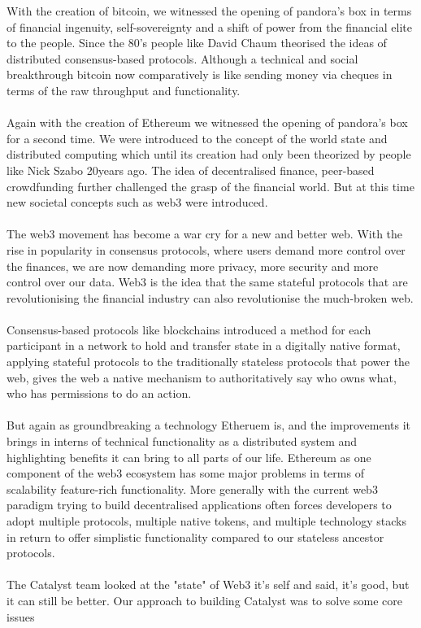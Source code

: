 With the creation of bitcoin, we witnessed the opening of pandora's box in terms of financial ingenuity, self-sovereignty and a shift of power from the financial elite to the people. Since the 80's people like David Chaum theorised the ideas of distributed consensus-based protocols. Although a technical and social breakthrough bitcoin now comparatively is like sending money via cheques in terms of the raw throughput and functionality.
\\\\
Again with the creation of Ethereum we witnessed the opening of pandora's box for a second time. We were introduced to the concept of the world state and distributed computing which until its creation had only been theorized by people like Nick Szabo 20years ago. The idea of decentralised finance, peer-based crowdfunding further challenged the grasp of the financial world. But at this time new societal concepts such as web3 were introduced.
\\\\
The web3 movement has become a war cry for a new and better web. With the rise in popularity in consensus protocols, where users demand more control over the finances, we are now demanding more privacy, more security and more control over our data. Web3 is the idea that the same stateful protocols that are revolutionising the financial industry can also revolutionise the much-broken web.
\\\\
Consensus-based protocols like blockchains introduced a method for each participant in a network to hold and transfer state in a digitally native format, applying stateful protocols to the traditionally stateless protocols that power the web, gives the web a native mechanism to authoritatively say who owns what, who has permissions to do an action.
\\\\
But again as groundbreaking a technology Etheruem is, and the improvements it brings in interns of technical functionality as a distributed system and highlighting benefits it can bring to all parts of our life. Ethereum as one component of the web3 ecosystem has some major problems in terms of scalability feature-rich functionality. More generally with the current web3 paradigm trying to build decentralised applications often forces developers to adopt multiple protocols, multiple native tokens, and multiple technology stacks in return to offer simplistic functionality compared to our stateless ancestor protocols.
\\\\
The Catalyst team looked at the "state" of Web3 it's self and said, it's good, but it can still be better. 
Our approach to building Catalyst was to solve some core issues

